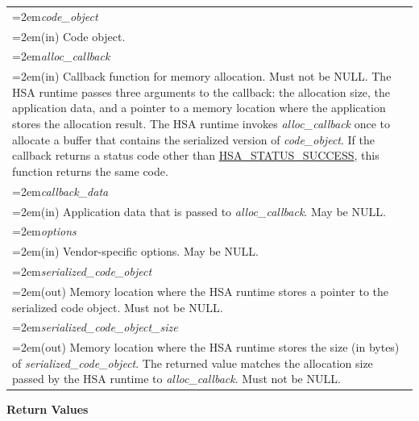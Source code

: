 \documentclass[final,oneside]{book}
\newcommand{\refarg}[1]{\textit{#1}}
\begin{document}
\noindent\begin{longtable}{@{}>{\hangindent=2em}p{\textwidth}}
\refarg{code_\-object}\\\hspace{2em}(in) Code object.\\[2mm]
\refarg{alloc_\-callback}\\\hspace{2em}(in) Callback function for memory allocation. Must not be NULL. The HSA runtime passes three arguments to the callback: the allocation size, the application data, and a pointer to a memory location where the application stores the allocation result. The HSA runtime invokes \textit{alloc_\-callback} once to allocate a buffer that contains the serialized version of \textit{code_\-object}. If the callback returns a status code other than \hyperlink{group__status_1ggad755322e7ff95456520e8abdbe90d225ae382ea0c9c05cce5a60d0317375159cc}{HSA_\-STATUS_\-SUCCESS}, this function returns the same code.\\[2mm]
\refarg{callback_\-data}\\\hspace{2em}(in) Application data that is passed to \textit{alloc_\-callback}. May be NULL.\\[2mm]
\refarg{options}\\\hspace{2em}(in) Vendor-specific options. May be NULL.\\[2mm]
\refarg{serialized_\-code_\-object}\\\hspace{2em}(out) Memory location where the HSA runtime stores a pointer to the serialized code object. Must not be NULL.\\[2mm]
\refarg{serialized_\-code_\-object_\-size}\\\hspace{2em}(out) Memory location where the HSA runtime stores the size (in bytes) of \textit{serialized_\-code_\-object}. The returned value matches the allocation size passed by the HSA runtime to \textit{alloc_\-callback}. Must not be NULL.
\end{longtable}
\vspace{-2mm}\textbf{Return Values}\\[-7mm]
\end{document}

